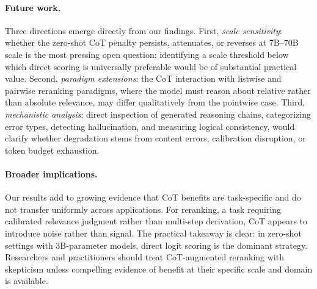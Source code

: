 \documentclass[12pt]{article}
\newcommand{\CoT}{CoT}
\begin{document}
\paragraph{Future work.}
Three directions emerge directly from our findings.  First, \emph{scale
sensitivity}: whether the zero-shot \CoT{} penalty persists, attenuates, or
reverses at 7B--70B scale is the most pressing open question; identifying a scale
threshold below which direct scoring is universally preferable would be of
substantial practical value.  Second, \emph{paradigm extensions}: the \CoT{}
interaction with listwise and pairwise reranking paradigms, where the model must
reason about relative rather than absolute relevance, may differ qualitatively
from the pointwise case.  Third, \emph{mechanistic analysis}: direct inspection
of generated reasoning chains, categorizing error types, detecting hallucination,
and measuring logical consistency, would clarify whether degradation stems from
content errors, calibration disruption, or token budget exhaustion.

\paragraph{Broader implications.}
Our results add to growing evidence that \CoT{} benefits are task-specific and
do not transfer uniformly across applications.  For reranking, a task requiring
calibrated relevance judgment rather than multi-step derivation, \CoT{} appears
to introduce noise rather than signal.  The practical takeaway is clear: in
zero-shot settings with 3B-parameter models, direct logit scoring is the dominant
strategy.  Researchers and practitioners should treat \CoT{}-augmented reranking
with skepticism unless compelling evidence of benefit at their specific scale and
domain is available.


\end{document}
